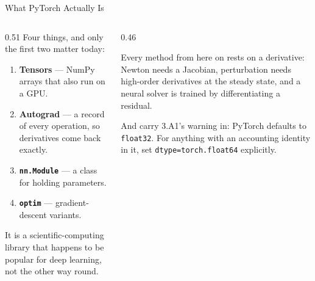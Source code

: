 \begin{frame}{What PyTorch Actually Is}
\begin{columns}[T]
\begin{column}{0.51\textwidth}
\small
Four things, and only the first two matter today:
\medskip
\begin{enumerate}\footnotesize
  \item \textbf{Tensors} --- NumPy arrays that also run on a GPU.
  \item \textbf{Autograd} --- a record of every operation, so derivatives come back exactly.
  \item \textbf{\texttt{nn.Module}} --- a class for holding parameters.
  \item \textbf{\texttt{optim}} --- gradient-descent variants.
\end{enumerate}
\medskip
It is a scientific-computing library that happens to be popular for deep learning, not the other way round.
\end{column}
\begin{column}{0.46\textwidth}
\begin{conceptbox}[title=\textbf{Why an economist needs it}]\small
Every method from here on rests on a derivative: Newton needs a Jacobian, perturbation needs high-order derivatives at the steady state, and a neural solver is trained by differentiating a residual.
\end{conceptbox}
\medskip
\begin{cautionbox}\footnotesize
And carry 3.A1's warning in: PyTorch defaults to \texttt{float32}. For anything with an accounting identity in it, set \texttt{dtype=torch.float64} explicitly.
\end{cautionbox}
\end{column}
\end{columns}
\vspace{1mm}
\end{frame}

